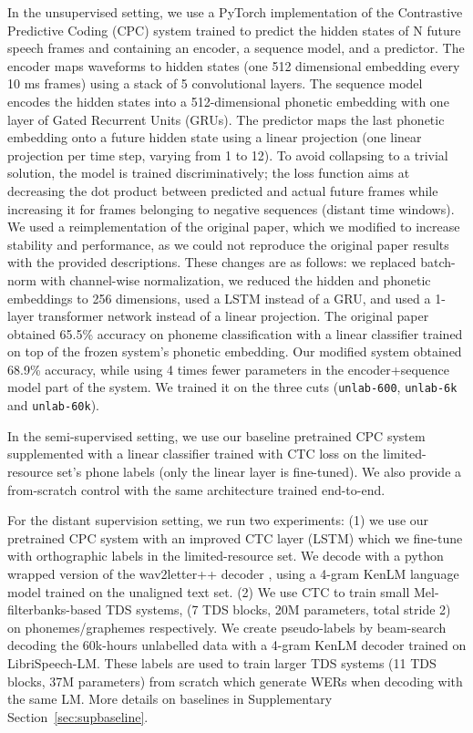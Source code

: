\documentclass{article}
\begin{document}
In the unsupervised setting, we use a PyTorch implementation of the Contrastive Predictive Coding (CPC) system \cite{vandenoord2018} trained to predict the hidden states of N future speech frames and containing an encoder, a sequence model, and a predictor. The encoder maps waveforms to hidden states (one 512 dimensional embedding every 10 ms frames) using a stack of 5 convolutional layers. The sequence model encodes the hidden states into a 512-dimensional phonetic embedding with one layer of Gated Recurrent Units (GRUs). The predictor maps the last phonetic embedding onto a future hidden state using a linear projection (one linear projection per time step, varying from 1 to 12). To avoid collapsing to a trivial solution, the model is trained discriminatively; the loss function aims at decreasing the dot product between predicted and actual future frames while increasing it for frames belonging to negative sequences (distant time windows). We used a reimplementation of the original paper, which we modified to increase stability and performance, as we could not reproduce the original paper results with the provided descriptions. These changes are as follows: we replaced batch-norm with channel-wise normalization, we reduced the hidden and phonetic embeddings to 256 dimensions, used a LSTM instead of a GRU, and used a 1-layer transformer network instead of a linear projection. The original paper obtained 65.5\% accuracy on phoneme classification with a linear classifier trained on top of the frozen system's phonetic embedding. Our modified system obtained 68.9\% accuracy, while using 4 times fewer parameters in the encoder+sequence model part of the system. We trained it on the three cuts (\texttt{unlab-600}, \texttt{unlab-6k} and \texttt{unlab-60k}). 





In the semi-supervised setting, we use our baseline pretrained CPC system supplemented with a linear classifier trained with CTC loss on the limited-resource set's phone labels (only the linear layer is fine-tuned). We also provide a from-scratch control with the same architecture trained end-to-end. 


For the distant supervision setting, we run two experiments: (1) we use our pretrained CPC system with an improved CTC layer (LSTM) which we fine-tune with orthographic labels in the limited-resource set. We decode with a python wrapped version of the wav2letter++ decoder \cite{wav2letter++}, using a 4-gram KenLM \cite{heafield2011kenlm} language model trained on the unaligned text set. (2) 
We use CTC to train small Mel-filterbanks-based TDS systems\cite{hannun2019tds}, (7 TDS blocks, 20M parameters, total stride 2) on phonemes/graphemes respectively. We create pseudo-labels by beam-search decoding the 60k-hours unlabelled data with a 4-gram KenLM decoder trained on LibriSpeech-LM. These labels are used to train larger TDS systems (11 TDS blocks, 37M parameters) from scratch which generate WERs when decoding with the same LM. More details on baselines in Supplementary Section~\ref{sec:supbaseline}.
\end{document}
